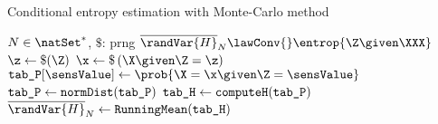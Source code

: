 \begin{algorithm}
    \caption{Conditional entropy estimation with Monte-Carlo method}
    \label{alg:entrop_MC}
    \begin{algorithmic}
        \Require \(N \in \natSet^*\), \(\$\): \gls{prng}
        \Ensure \(\overline{\randVar{H}}_N \lawConv{} \entrop{\Z \given \XXX}\)
            \State \(\z \gets \$(\Z)\)
            \State \(\x \gets \$\left(\X \given \Z = \z\right)\)
            \For{\(\sensValue \in \sensVarSet\)}
                \State \(\verb+tab_P+[\sensValue] \gets \prob{\X=\x \given \Z = \sensValue}\)
            \EndFor
            \State \(\verb+tab_P+ \gets\verb+normDist+(\verb+tab_P+)\)
            \State \(\verb+tab_H+ \gets \verb+computeH+(\verb+tab_P+)\)
            \State \(\overline{\randVar{H}}_N \gets \verb+RunningMean+(\verb+tab_H+)\)
        \EndFor
    \end{algorithmic}
\end{algorithm}